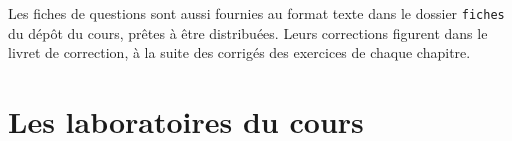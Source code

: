 \begin{boxinfo}
Les fiches de questions sont aussi fournies au format texte dans le dossier
\texttt{fiches} du dépôt du cours, prêtes à être distribuées. Leurs
corrections figurent dans le livret de correction, à la suite des corrigés
des exercices de chaque chapitre.
\end{boxinfo}

\section*{Les laboratoires du cours}



